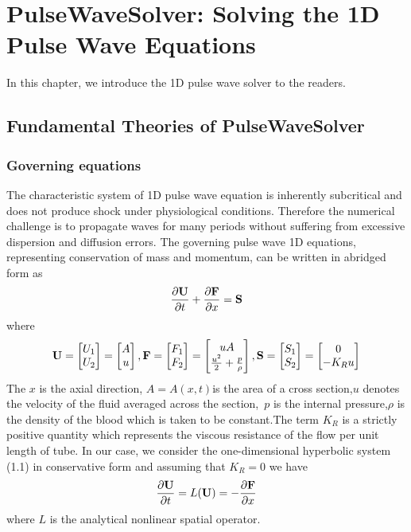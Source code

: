\chapter{PulseWaveSolver: Solving the 1D Pulse Wave Equations}

In this chapter, we introduce the 1D pulse wave solver to the readers.
\section{Fundamental Theories of PulseWaveSolver}
\subsection{Governing equations}
The characteristic system  of 1D pulse wave equation is inherently subcritical and does not produce shock under physiological conditions. Therefore the numerical challenge is to propagate waves for many periods without suffering from excessive dispersion and diffusion errors.
The governing pulse wave 1D equations, representing conservation of mass and momentum, can be written in abridged form as
\begin{equation}
\frac{\partial\textbf U}{\partial t}+\frac{\partial \textbf F}{\partial x}=\textbf S
\end{equation}
where 
\begin{equation}\nonumber
\textbf{U}=
\begin{bmatrix}
U_1 \\
U_2
\end{bmatrix}
=
\begin{bmatrix}
A\\
u
\end{bmatrix}
,
\textbf F=
\begin{bmatrix}
F_1\\
F_2
\end{bmatrix}
=
\begin{bmatrix}
uA\\
\frac{u^2}{2}+\frac{p}{\rho}
\end{bmatrix}
,
\textbf S=
\begin{bmatrix}
S_1\\
S_2
\end{bmatrix}
=
\begin{bmatrix}
0\\
-K_R u
\end{bmatrix}
\end{equation}
The $x$ is the axial direction, $A=A(x,t)$is the area of a cross section,$u$ denotes the velocity of the fluid averaged across the section,\ $p$ is the internal pressure,$\rho$ is the density of the blood which is taken to be constant.The term $K_R$ is a strictly positive quantity which represents the viscous resistance of the flow per unit length of tube.
\newline
In our case, we consider the one-dimensional hyperbolic system (1.1) in conservative form and assuming that $K_R=0$ we have
\begin{equation}
\frac{\partial\textbf U}{\partial t}=L({\textbf U})=-\frac{\partial \textbf F}{\partial x}
\end{equation}
where $L$ is the analytical nonlinear spatial operator.


